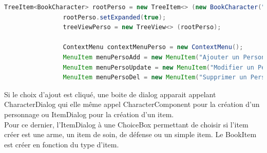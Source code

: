 			\begin{lstlisting}[language=java]
				TreeItem<BookCharacter> rootPerso = new TreeItem<> (new BookCharacter("0", "Personnage", 0, 0, null, null, 0));
				rootPerso.setExpanded(true);
				treeViewPerso = new TreeView<> (rootPerso);

				ContextMenu contextMenuPerso = new ContextMenu();
				MenuItem menuPersoAdd = new MenuItem("Ajouter un Personnage");
				MenuItem menuPersoUpdate = new MenuItem("Modifier un Personnage");
				MenuItem menuPersoDel = new MenuItem("Supprimer un Personnage");
			\end{lstlisting}

			Si le choix d'ajout est cliqué, une boite de dialog apparait appelant CharacterDialog qui elle même appel CharacterComponent pour la création d'un personnage ou ItemDialog pour la création d'un item.\\
			Pour ce dernier, l'ItemDialog à une ChoiceBox permettant de choisir si l'item créer est une arme, un item de soin, de défense ou un simple item. Le BookItem est créer en fonction du type d'item.\\
